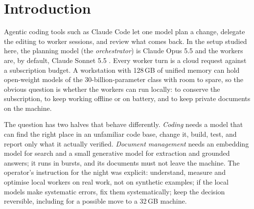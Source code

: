 \clearpage


\tableofcontents
\listoftables
\clearpage

\renewcommand{\sectionmark}[1]{\markboth{\thesection.\ #1}{\thesection.\ #1}}
\renewcommand{\subsectionmark}[1]{}


\section{Introduction}\label{sec:intro}

Agentic coding tools such as Claude Code \citep{Anthropic-2026aa} let one model plan a change, delegate the editing to
worker sessions, and review what comes back. In the setup studied here, the planning model (the
\emph{orchestrator}) is Claude Opus 5.5 and the workers are, by default, Claude Sonnet 5.5 \citep{Anthropic-2026ab}.
Every worker turn is a cloud request against a subscription budget. A workstation with 128\,GB of unified memory can
hold open-weight models of the 30-billion-parameter class with room to spare, so the obvious question is whether the
workers can run locally: to conserve the subscription, to keep working offline or on battery, and to keep private
documents on the machine.

The question has two halves that behave differently. \emph{Coding} needs a model that can find the right place in an
unfamiliar code base, change it, build, test, and report only what it actually verified. \emph{Document management} needs an embedding model
for search and a small generative model for extraction and grounded answers; it runs in bursts, and its documents
must not leave the machine. The operator's instruction for the night was explicit: understand, measure and optimise
local workers on real work, not on synthetic examples; if the local models make systematic errors, fix them
systematically; keep the decision reversible, including for a possible move to a 32\,GB machine.

